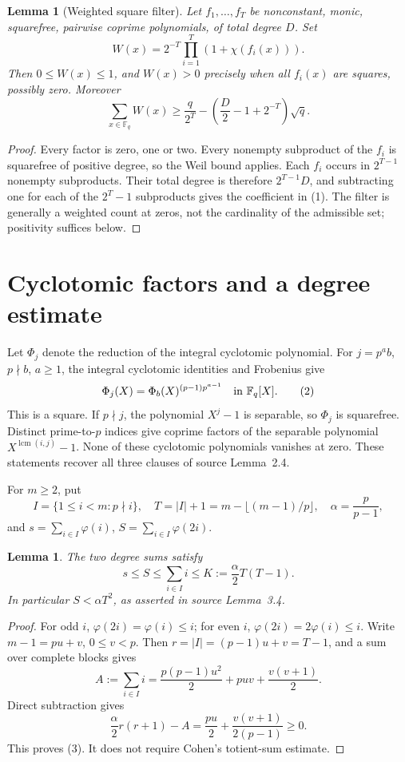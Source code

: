 \documentclass[11pt,a4paper]{article}
\newtheorem{lemma}[theorem]{Lemma}
\newcommand{\F}{\mathbb F}
\begin{document}
\begin{lemma}[Weighted square filter]\label{weighted}
Let $f_1,\ldots,f_T$ be nonconstant, monic, squarefree, pairwise coprime
polynomials, of total degree $D$. Set
\[
 W(x)=2^{-T}\prod_{i=1}^T(1+\chi(f_i(x))).
\]
Then $0\le W(x)\le1$, and $W(x)>0$ precisely when all $f_i(x)$ are
squares, possibly zero. Moreover
\[
 \sum_{x\in\F_q}W(x)\ge
 \frac q{2^T}-\left(\frac D2-1+2^{-T}\right)\sqrt q.
 \tag{1}
\]
\end{lemma}
\begin{proof}
Every factor is zero, one or two. Every nonempty subproduct of the $f_i$
is squarefree of positive degree, so the Weil bound applies. Each $f_i$
occurs in $2^{T-1}$ nonempty subproducts. Their total degree is therefore
$2^{T-1}D$, and subtracting one for each of the $2^T-1$ subproducts gives
the coefficient in (1). The filter is generally a weighted count at zeros,
not the cardinality of the admissible set; positivity suffices below.
\end{proof}

\section{Cyclotomic factors and a degree estimate}
Let $\Phi_j$ denote the reduction of the integral cyclotomic polynomial.
For $j=p^a b$, $p\nmid b$, $a\ge1$, the integral cyclotomic identities
and Frobenius give
\[
 \Phi_j(X)=\Phi_b(X)^{(p-1)p^{a-1}}\quad\hbox{in }\F_q[X]. \tag{2}
\]
This is a square. If $p\nmid j$, the polynomial $X^j-1$ is separable,
so $\Phi_j$ is squarefree. Distinct prime-to-$p$ indices give coprime
factors of the separable polynomial $X^{\operatorname{lcm}(i,j)}-1$.
None of these cyclotomic polynomials vanishes at zero. These statements
recover all three clauses of source Lemma~2.4.

For $m\ge2$, put
\[
 I=\{1\le i<m:p\nmid i\},\quad T=|I|+1=m-\lfloor(m-1)/p\rfloor,
 \quad \alpha=\frac p{p-1},
\]
and $s=\sum_{i\in I}\varphi(i)$, $S=\sum_{i\in I}\varphi(2i)$.
\begin{lemma}\label{degree}
The two degree sums satisfy
\[
 s\le S\le \sum_{i\in I}i\le K:=\frac\alpha2 T(T-1).
 \tag{3}
\]
In particular $S<\alpha T^2$, as asserted in source Lemma~3.4.
\end{lemma}
\begin{proof}
For odd $i$, $\varphi(2i)=\varphi(i)\le i$; for even $i$,
$\varphi(2i)=2\varphi(i)\le i$. Write $m-1=pu+v$, $0\le v<p$.
Then $r=|I|=(p-1)u+v=T-1$, and a sum over complete blocks gives
\[
 A:=\sum_{i\in I}i=\frac{p(p-1)u^2}2+puv+\frac{v(v+1)}2.
\]
Direct subtraction gives
\[
 \frac\alpha2r(r+1)-A=\frac{pu}2+\frac{v(v+1)}{2(p-1)}\ge0.
\]
This proves (3). It does not require Cohen's totient-sum estimate.
\end{proof}
\end{document}
